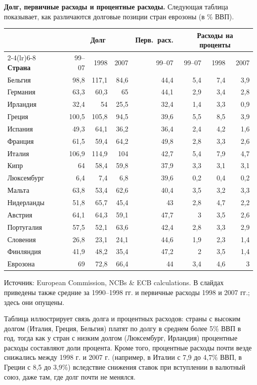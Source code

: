 \documentclass[11pt,a4paper]{article}
\begin{document}
\textbf{Долг, первичные расходы и процентные расходы.} Следующая таблица показывает, как различаются долговые позиции стран еврозоны (в \% ВВП).

\begin{center}
\footnotesize
\setlength{\tabcolsep}{4pt}
\begin{tabular}{lrrrrrrr}
\toprule
 & \multicolumn{3}{c}{\textbf{Долг}} & \textbf{Перв.\ расх.} & \multicolumn{3}{c}{\textbf{Расходы на проценты}}\\
\cmidrule(lr){2-4}\cmidrule(lr){6-8}
\textbf{Страна} & 99--07 & 1998 & 2007 & 99--07 & 99--07 & 1998 & 2007\\
\midrule
Бельгия & 98,8 & 117,1 & 84,6 & 44,4 & 5,4 & 7,4 & 3,9\\
Германия & 63,3 & 60,3 & 65 & 44,1 & 2,9 & 3,4 & 2,8\\
Ирландия & 32,4 & 54 & 25,5 & 32,4 & 1,4 & 3,3 & 0,9\\
Греция & 100,5 & 105,8 & 94,5 & 39,6 & 5,5 & 8,5 & 3,9\\
Испания & 49,3 & 64,1 & 36,2 & 36,4 & 2,4 & 4,2 & 1,6\\
Франция & 61,5 & 59,4 & 64,2 & 49,8 & 2,8 & 3,3 & 2,6\\
Италия & 106,9 & 114,9 & 104 & 42,7 & 5,4 & 7,9 & 4,7\\
Кипр & 64 & 58,4 & 59,8 & 37,9 & 3,3 & 3,1 & 3,1\\
Люксембург & 6,4 & 7,4 & 6,8 & 39,6 & 0,2 & 0,4 & 0,2\\
Мальта & 63,8 & 53,4 & 62,6 & 40,4 & 3,5 & 3,2 & 3,3\\
Нидерланды & 51,8 & 65,7 & 45,4 & 43 & 2,8 & 4,7 & 2,2\\
Австрия & 64,1 & 64,3 & 59,1 & 47,7 & 3 & 3,5 & 2,6\\
Португалия & 57,5 & 52,1 & 63,6 & 42,4 & 2,8 & 3,3 & 2,9\\
Словения & 26,8 & 23,1 & 24,1 & 44,6 & 1,9 & 2,3 & 1,4\\
Финляндия & 41,9 & 48,2 & 35,4 & 47,2 & 2 & 3,5 & 1,4\\
\midrule
Еврозона & 69 & 72,8 & 66,4 & 44 & 3,4 & 4,6 & 3\\
\bottomrule
\end{tabular}

{\footnotesize Источник: European Commission, NCBs \& ECB calculations. В слайдах приведены также средние за 1990--1998 гг. и первичные расходы 1998 и 2007 гг.; здесь они опущены.}
\end{center}

Таблица иллюстрирует связь долга и процентных расходов: страны с высоким долгом (Италия, Греция, Бельгия) платят по долгу в среднем более 5\% ВВП в год, тогда как у стран с низким долгом (Люксембург, Ирландия) процентные расходы составляют доли процента. Кроме того, процентные расходы почти везде снижались между 1998 г. и 2007 г. (например, в Италии с 7,9 до 4,7\% ВВП, в Греции с 8,5 до 3,9\%) вследствие снижения ставок при вступлении в валютный союз, даже там, где долг почти не менялся.
\end{document}

